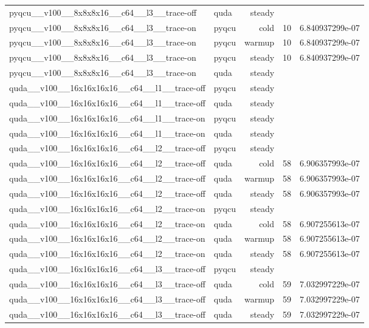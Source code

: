 \begin{table}[htbp]
\begin{tabular}{@{}llrrr@{}}
pyqcu\_\_v100\_\_8x8x8x16\_\_c64\_\_l3\_\_trace-off & quda & steady &  &  \\
pyqcu\_\_v100\_\_8x8x8x16\_\_c64\_\_l3\_\_trace-on & pyqcu & cold & 10 & 6.840937299e-07 \\
pyqcu\_\_v100\_\_8x8x8x16\_\_c64\_\_l3\_\_trace-on & pyqcu & warmup & 10 & 6.840937299e-07 \\
pyqcu\_\_v100\_\_8x8x8x16\_\_c64\_\_l3\_\_trace-on & pyqcu & steady & 10 & 6.840937299e-07 \\
pyqcu\_\_v100\_\_8x8x8x16\_\_c64\_\_l3\_\_trace-on & quda & steady &  &  \\
quda\_\_v100\_\_16x16x16x16\_\_c64\_\_l1\_\_trace-off & pyqcu & steady &  &  \\
quda\_\_v100\_\_16x16x16x16\_\_c64\_\_l1\_\_trace-off & quda & steady &  &  \\
quda\_\_v100\_\_16x16x16x16\_\_c64\_\_l1\_\_trace-on & pyqcu & steady &  &  \\
quda\_\_v100\_\_16x16x16x16\_\_c64\_\_l1\_\_trace-on & quda & steady &  &  \\
quda\_\_v100\_\_16x16x16x16\_\_c64\_\_l2\_\_trace-off & pyqcu & steady &  &  \\
quda\_\_v100\_\_16x16x16x16\_\_c64\_\_l2\_\_trace-off & quda & cold & 58 & 6.906357993e-07 \\
quda\_\_v100\_\_16x16x16x16\_\_c64\_\_l2\_\_trace-off & quda & warmup & 58 & 6.906357993e-07 \\
quda\_\_v100\_\_16x16x16x16\_\_c64\_\_l2\_\_trace-off & quda & steady & 58 & 6.906357993e-07 \\
quda\_\_v100\_\_16x16x16x16\_\_c64\_\_l2\_\_trace-on & pyqcu & steady &  &  \\
quda\_\_v100\_\_16x16x16x16\_\_c64\_\_l2\_\_trace-on & quda & cold & 58 & 6.907255613e-07 \\
quda\_\_v100\_\_16x16x16x16\_\_c64\_\_l2\_\_trace-on & quda & warmup & 58 & 6.907255613e-07 \\
quda\_\_v100\_\_16x16x16x16\_\_c64\_\_l2\_\_trace-on & quda & steady & 58 & 6.907255613e-07 \\
quda\_\_v100\_\_16x16x16x16\_\_c64\_\_l3\_\_trace-off & pyqcu & steady &  &  \\
quda\_\_v100\_\_16x16x16x16\_\_c64\_\_l3\_\_trace-off & quda & cold & 59 & 7.032997229e-07 \\
quda\_\_v100\_\_16x16x16x16\_\_c64\_\_l3\_\_trace-off & quda & warmup & 59 & 7.032997229e-07 \\
quda\_\_v100\_\_16x16x16x16\_\_c64\_\_l3\_\_trace-off & quda & steady & 59 & 7.032997229e-07 \\

\end{tabular}
\end{table}
